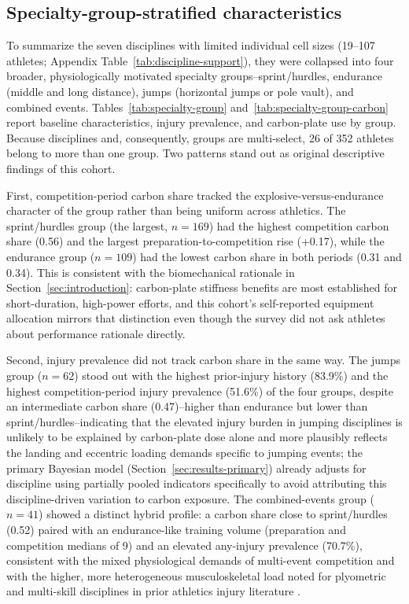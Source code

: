 \subsection{Specialty-group-stratified characteristics}
\label{sec:results-discipline}
To summarize the seven disciplines with limited individual cell sizes (19--107 athletes; Appendix Table~\ref{tab:discipline-support}), they were collapsed into four broader, physiologically motivated specialty groups--sprint/hurdles, endurance (middle and long distance), jumps (horizontal jumps or pole vault), and combined events. Tables~\ref{tab:specialty-group} and~\ref{tab:specialty-group-carbon} report baseline characteristics, injury prevalence, and carbon-plate use by group. Because disciplines and, consequently, groups are multi-select, 26 of 352 athletes belong to more than one group. Two patterns stand out as original descriptive findings of this cohort.

First, competition-period carbon share tracked the explosive-versus-endurance character of the group rather than being uniform across athletics. The sprint/hurdles group (the largest, $n=169$) had the highest competition carbon share (0.56) and the largest preparation-to-competition rise (+0.17), while the endurance group ($n=109$) had the lowest carbon share in both periods (0.31 and 0.34). This is consistent with the biomechanical rationale in Section~\ref{sec:introduction}: carbon-plate stiffness benefits are most established for short-duration, high-power efforts, and this cohort's self-reported equipment allocation mirrors that distinction even though the survey did not ask athletes about performance rationale directly.

Second, injury prevalence did not track carbon share in the same way. The jumps group ($n=62$) stood out with the highest prior-injury history (83.9\%) and the highest competition-period injury prevalence (51.6\%) of the four groups, despite an intermediate carbon share (0.47)--higher than endurance but lower than sprint/hurdles--indicating that the elevated injury burden in jumping disciplines is unlikely to be explained by carbon-plate dose alone and more plausibly reflects the landing and eccentric loading demands specific to jumping events; the primary Bayesian model (Section~\ref{sec:results-primary}) already adjusts for discipline using partially pooled indicators specifically to avoid attributing this discipline-driven variation to carbon exposure. The combined-events group ($n=41$) showed a distinct hybrid profile: a carbon share close to sprint/hurdles (0.52) paired with an endurance-like training volume (preparation and competition medians of 9) and an elevated any-injury prevalence (70.7\%), consistent with the mixed physiological demands of multi-event competition and with the higher, more heterogeneous musculoskeletal load noted for plyometric and multi-skill disciplines in prior athletics injury literature \citep{edouard2020injury}.

